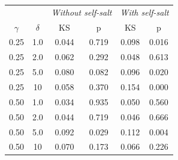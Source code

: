 \begin{tabular}{@{}cc|cc|cc@{}}
\toprule
& & \multicolumn{2}{c|}{\textit{Without self-salt}} & \multicolumn{2}{c}{\textit{With self-salt}} \\
$\gamma$ & $\delta$ & KS & p & KS & p \\
\midrule
0.25 & 1.0 & 0.044 & 0.719 & 0.098 & 0.016 \\
0.25 & 2.0 & 0.062 & 0.292 & 0.048 & 0.613 \\
0.25 & 5.0 & 0.080 & 0.082 & 0.096 & 0.020 \\
0.25 & 10 & 0.058 & 0.370 & 0.154 & 0.000 \\
0.50 & 1.0 & 0.034 & 0.935 & 0.050 & 0.560 \\
0.50 & 2.0 & 0.044 & 0.719 & 0.046 & 0.666 \\
0.50 & 5.0 & 0.092 & 0.029 & 0.112 & 0.004 \\
0.50 & 10 & 0.070 & 0.173 & 0.066 & 0.226 \\
\bottomrule
\end{tabular}
